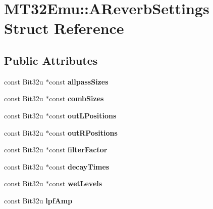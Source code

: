 \hypertarget{structMT32Emu_1_1AReverbSettings}{\section{M\-T32\-Emu\-:\-:A\-Reverb\-Settings Struct Reference}
\label{structMT32Emu_1_1AReverbSettings}
}
\subsection*{Public Attributes}
\begin{DoxyCompactItemize}
\item 
\hypertarget{structMT32Emu_1_1AReverbSettings_a0e48689b578aa7de420d43ca393e3493}{const Bit32u $\ast$const {\bfseries allpass\-Sizes}}\label{structMT32Emu_1_1AReverbSettings_a0e48689b578aa7de420d43ca393e3493}

\item 
\hypertarget{structMT32Emu_1_1AReverbSettings_ab055a1bf6c36fe4364e019fe44b25b91}{const Bit32u $\ast$const {\bfseries comb\-Sizes}}\label{structMT32Emu_1_1AReverbSettings_ab055a1bf6c36fe4364e019fe44b25b91}

\item 
\hypertarget{structMT32Emu_1_1AReverbSettings_ad631c59231e2703abd09af7e82656082}{const Bit32u $\ast$const {\bfseries out\-L\-Positions}}\label{structMT32Emu_1_1AReverbSettings_ad631c59231e2703abd09af7e82656082}

\item 
\hypertarget{structMT32Emu_1_1AReverbSettings_a0401bf71604f968d4d804c0815536f11}{const Bit32u $\ast$const {\bfseries out\-R\-Positions}}\label{structMT32Emu_1_1AReverbSettings_a0401bf71604f968d4d804c0815536f11}

\item 
\hypertarget{structMT32Emu_1_1AReverbSettings_a6bf6a62465af9e2d29a2d266772d9797}{const Bit32u $\ast$const {\bfseries filter\-Factor}}\label{structMT32Emu_1_1AReverbSettings_a6bf6a62465af9e2d29a2d266772d9797}

\item 
\hypertarget{structMT32Emu_1_1AReverbSettings_ad5d0d4136dae254d8ee4cc48f50ff1f2}{const Bit32u $\ast$const {\bfseries decay\-Times}}\label{structMT32Emu_1_1AReverbSettings_ad5d0d4136dae254d8ee4cc48f50ff1f2}

\item 
\hypertarget{structMT32Emu_1_1AReverbSettings_a5df064b718491b6a60f80536080e87c7}{const Bit32u $\ast$const {\bfseries wet\-Levels}}\label{structMT32Emu_1_1AReverbSettings_a5df064b718491b6a60f80536080e87c7}

\item 
\hypertarget{structMT32Emu_1_1AReverbSettings_ad539826807fd10b2edcc6b7454c5dbe8}{const Bit32u {\bfseries lpf\-Amp}}\label{structMT32Emu_1_1AReverbSettings_ad539826807fd10b2edcc6b7454c5dbe8}

\end{DoxyCompactItemize}


